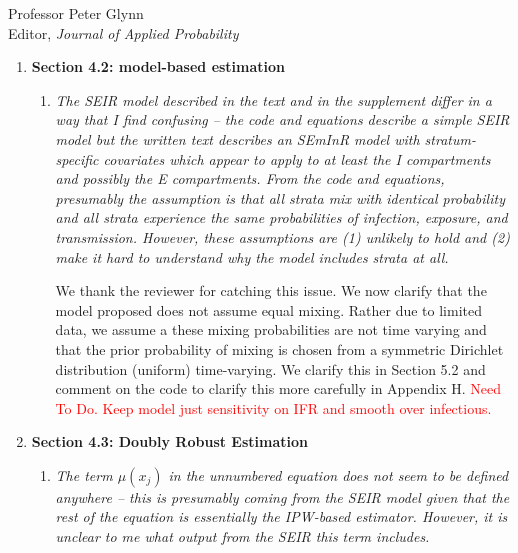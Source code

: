\documentclass[11pt]{letter} %
\begin{document}
\begin{letter}{Professor
	Peter Glynn\\
	Editor, {\em Journal of Applied Probability}}
\begin{enumerate}
\begin{enumerate}
	Section 4.1.3 allows researchers to choose to go beyond simpler moving window averages (i.e., daily/weekly averages).  The kernel function allows the user to choose weighted averages that may be more robust than the uniform kernel (which is equivalent to the a moving average over some fixed window of time).  The proposed approach helps smooth the estimated propensity over time; moreover, the flexibility of the approach for government agencies who may observed random samples at different frequencies is of practical importance.
	\vspace{5mm}
\end{enumerate}
\item {\bf Section 4.2: model-based estimation}
\begin{enumerate}
	\item {\it The SEIR model described in the text and in the supplement differ in a way that I find confusing – the code and equations describe a simple SEIR model but the written text describes an SEmInR model with stratum-specific covariates which appear to apply to at least the I compartments and possibly the E compartments. From the code and equations, presumably the assumption is that all strata mix with identical probability and all strata experience the same probabilities of infection, exposure, and transmission. However, these assumptions are (1) unlikely to hold and (2) make it hard to understand why the model includes strata at all. }
	\vspace{5mm}

	We thank the reviewer for catching this issue.  We now clarify that the model proposed does not assume equal mixing.  Rather due to limited data, we assume a these mixing probabilities are not time varying and that the  prior probability of mixing is chosen from a symmetric Dirichlet distribution (uniform) time-varying.  We clarify this in Section 5.2 and comment on the code to clarify this more carefully in Appendix H.
	\textcolor{red}{Need To Do.  Keep model just sensitivity on IFR and smooth over infectious.}
	\vspace{5mm}
\end{enumerate}
\item {\bf Section 4.3: Doubly Robust Estimation}
\begin{enumerate}
	\item {\it The term $\mu(x_j)$ in the unnumbered equation does not seem to be defined anywhere – this is presumably coming from the SEIR model given that the rest of the equation is essentially the IPW-based estimator. However, it is unclear to me what output from the SEIR this term includes.}
	\vspace{5mm}


\end{enumerate}
\end{enumerate}
\end{letter}
\end{document}
